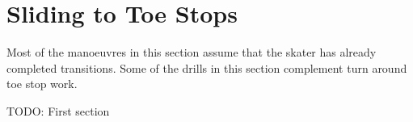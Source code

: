 \section{Sliding to Toe Stops}
\label{sec:toe_stops/slides}

Most of the manoeuvres in this section assume that the skater has already completed transitions.
Some of the drills in this section complement turn around toe stop work.    

{\color{red} TODO: First section}

